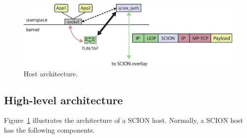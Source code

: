 \begin{figure}[ht]
\centering
\begin{minipage}{0.85\textwidth}
\includegraphics[width=1\columnwidth]{./fig/host2.eps}
\end{minipage}
\caption{Host architecture.}\label{fig:host}
\end{figure}

\subsection{High-level architecture} 


Figure~\ref{fig:host} illustrates the architecture of a SCION host.
Normally, a SCION host has the following components.

